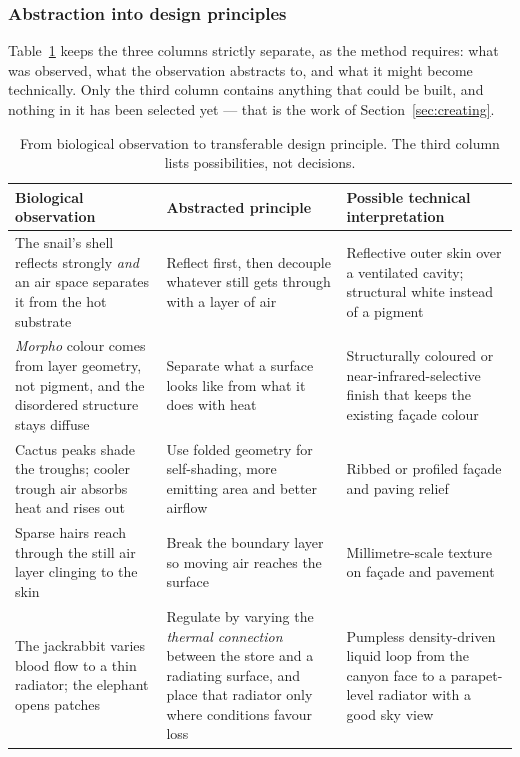 \subsubsection{Abstraction into design principles}

Table~\ref{tab:abstraction} keeps the three columns strictly separate, as the
method requires: what was observed, what the observation abstracts to, and what
it might become technically. Only the third column contains anything that could
be built, and nothing in it has been selected yet --- that is the work of
Section~\ref{sec:creating}.

\begin{table}[htbp]
\centering
\caption{From biological observation to transferable design principle. The third
column lists possibilities, not decisions.}
\label{tab:abstraction}
\renewcommand{\arraystretch}{1.25}
\footnotesize
\begin{tabularx}{\textwidth}{X X X}
\toprule
\textbf{Biological observation} & \textbf{Abstracted principle} & \textbf{Possible technical interpretation} \\
\midrule
The snail's shell reflects strongly \emph{and} an air space separates it from the
hot substrate
& Reflect first, then decouple whatever still gets through with a layer of air
& Reflective outer skin over a ventilated cavity; structural white instead of a
pigment \\
\emph{Morpho} colour comes from layer geometry, not pigment, and the disordered
structure stays diffuse
& Separate what a surface looks like from what it does with heat
& Structurally coloured or near-infrared-selective finish that keeps the
existing façade colour \\
Cactus peaks shade the troughs; cooler trough air absorbs heat and rises out
& Use folded geometry for self-shading, more emitting area and better airflow
& Ribbed or profiled façade and paving relief \\
Sparse hairs reach through the still air layer clinging to the skin
& Break the boundary layer so moving air reaches the surface
& Millimetre-scale texture on façade and pavement \\
The jackrabbit varies blood flow to a thin radiator; the elephant opens patches
& Regulate by varying the \emph{thermal connection} between the store and a
radiating surface, and place that radiator only where conditions favour loss
& Pumpless density-driven liquid loop from the canyon face to a parapet-level
radiator with a good sky view \\

\end{tabularx}
\end{table}

